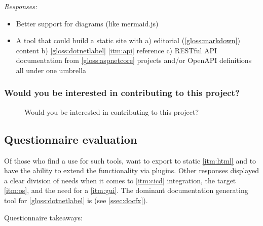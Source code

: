 \textit{Responses:}
\begin{itemize}
    \item Better support for diagrams (like mermaid.js)
    \item A tool that could build a static site with a) editorial (\ref{gloss:markdown}) content b) \ref{gloss:dotnetlabel} \ref{itm:api} reference c) RESTful API documentation from \ref{gloss:aspnetcore} projects and/or OpenAPI definitions all under one umbrella
\end{itemize}

\subsubsection*{Would you be interested in contributing to this project?}

\begin{figure}[H]
    \centering
    \caption{Would you be interested in contributing to this project?}
\end{figure}

\subsection{Questionnaire evaluation} \label{ssec:questionnaireeval}

Of those who find a use for such tools, want to export to static \ref{itm:html} and to have the ability to extend the functionality via plugins.
Other responses displayed a clear division of needs when it comes to \ref{itm:cicd} integration, the target \ref{itm:os}, and the need for a \ref{itm:gui}.
The dominant documentation generating tool for \ref{gloss:dotnetlabel} is  (see \ref{ssec:docfx}).

Questionnaire takeaways:

